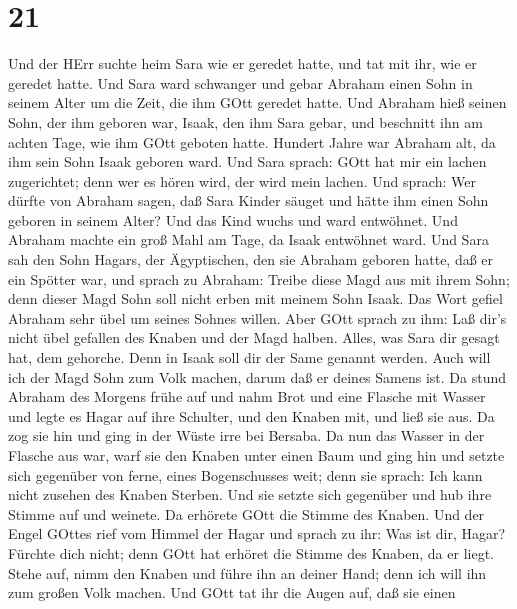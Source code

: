 \hypertarget{section-20}{%
\section{21}\label{section-20}}

 Und der HErr suchte heim Sara wie er geredet hatte, und tat
mit ihr, wie er geredet hatte.  Und Sara ward schwanger und
gebar Abraham einen Sohn in seinem Alter um die Zeit, die ihm GOtt
geredet hatte.  Und Abraham hieß seinen Sohn, der ihm
geboren war, Isaak, den ihm Sara gebar,  und beschnitt ihn
am achten Tage, wie ihm GOtt geboten hatte.  Hundert Jahre
war Abraham alt, da ihm sein Sohn Isaak geboren ward.  Und
Sara sprach: GOtt hat mir ein lachen zugerichtet; denn wer es hören
wird, der wird mein lachen.  Und sprach: Wer dürfte von
Abraham sagen, daß Sara Kinder säuget und hätte ihm einen Sohn geboren
in seinem Alter?  Und das Kind wuchs und ward entwöhnet. Und
Abraham machte ein groß Mahl am Tage, da Isaak entwöhnet ward.
 Und Sara sah den Sohn Hagars, der Ägyptischen, den sie
Abraham geboren hatte, daß er ein Spötter war,  und sprach
zu Abraham: Treibe diese Magd aus mit ihrem Sohn; denn dieser Magd Sohn
soll nicht erben mit meinem Sohn Isaak.  Das Wort gefiel
Abraham sehr übel um seines Sohnes willen.  Aber GOtt
sprach zu ihm: Laß dir's nicht übel gefallen des Knaben und der Magd
halben. Alles, was Sara dir gesagt hat, dem gehorche. Denn in Isaak soll
dir der Same genannt werden.  Auch will ich der Magd Sohn
zum Volk machen, darum daß er deines Samens ist.  Da stund
Abraham des Morgens frühe auf und nahm Brot und eine Flasche mit Wasser
und legte es Hagar auf ihre Schulter, und den Knaben mit, und ließ sie
aus. Da zog sie hin und ging in der Wüste irre bei Bersaba.
 Da nun das Wasser in der Flasche aus war, warf sie den
Knaben unter einen Baum  und ging hin und setzte sich
gegenüber von ferne, eines Bogenschusses weit; denn sie sprach: Ich kann
nicht zusehen des Knaben Sterben. Und sie setzte sich gegenüber und hub
ihre Stimme auf und weinete.  Da erhörete GOtt die Stimme
des Knaben. Und der Engel GOttes rief vom Himmel der Hagar und sprach zu
ihr: Was ist dir, Hagar? Fürchte dich nicht; denn GOtt hat erhöret die
Stimme des Knaben, da er liegt.  Stehe auf, nimm den Knaben
und führe ihn an deiner Hand; denn ich will ihn zum großen Volk machen.
 Und GOtt tat ihr die Augen auf, daß sie einen
